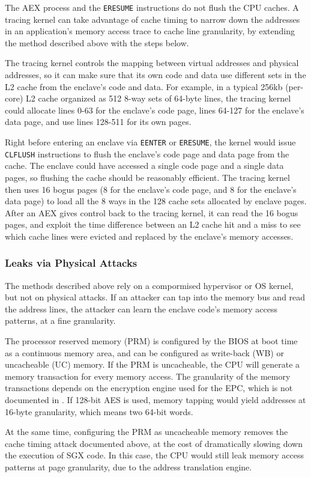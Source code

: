 The AEX process and the \texttt{ERESUME} instructions do not flush the CPU
caches. A tracing kernel can take advantage of cache timing to narrow down
the addresses in an application's memory access trace to cache line
granularity, by extending the method described above with the steps below.

The tracing kernel controls the mapping between virtual addresses and physical
addresses, so it can make sure that its own code and data use different sets
in the L2 cache from the enclave's code and data. For example, in a typical
256kb (per-core) L2 cache organized as 512 8-way sets of 64-byte lines, the
tracing kernel could allocate lines 0-63 for the enclave's code page, lines
64-127 for the enclave's data page, and use lines 128-511 for its own pages.

Right before entering an enclave via \texttt{EENTER} or \texttt{ERESUME}, the
kernel would issue \texttt{CLFLUSH} instructions to flush the enclave's code
page and data page from the cache. The enclave could have accessed a single
code page and a single data pages, so flushing the cache should be reasonably
efficient. The tracing kernel then uses 16 bogus pages (8 for the enclave's
code page, and 8 for the enclave's data page) to load all the 8 ways in the 128
cache sets allocated by enclave pages. After an AEX gives control back to the
tracing kernel, it can read the 16 bogus pages, and exploit the time difference
between an L2 cache hit and a miss to see which cache lines were evicted and
replaced by the enclave's memory accesses.

\subsubsection{Leaks via Physical Attacks}

The methods described above rely on a compormised hypervisor or OS kernel, but
not on physical attacks. If an attacker can tap into the memory bus and read
the address lines, the attacker can learn the enclave code's memory access
patterns, at a fine granularity.

The processor reserved memory (PRM) is configured by the BIOS at boot time as
a continuous memory area, and can be configured as write-back (WB) or
uncacheable (UC) memory. If the PRM is uncacheable, the CPU will generate a
memory transaction for every memory access. The granularity of the memory
transactions depends on the encryption engine used for the EPC, which is not
documented in \cite{intel2013sgxmanual}. If 128-bit AES is used, memory tapping
would yield addresses at 16-byte granularity, which means two 64-bit words.

At the same time, configuring the PRM as uncacheable memory removes the cache
timing attack documented above, at the cost of dramatically slowing down the
execution of SGX code. In this case, the CPU would still leak memory access
patterns at page granularity, due to the address translation engine.

